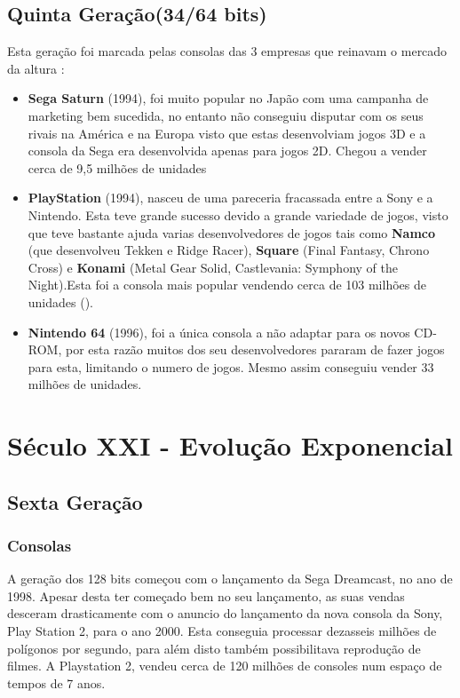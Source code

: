 \documentclass{report}
\begin{document}
\subsection{Quinta Geração(34/64 bits)}
\label{subsec.Quinta Geração}
Esta geração foi marcada pelas consolas das 3 empresas que reinavam o mercado da altura \cite{quintageracao}:
 \begin{itemize}
     \item \textbf{Sega Saturn} (1994), foi muito popular no Japão com uma campanha de marketing bem sucedida, no entanto não conseguiu disputar com os seus rivais na América e na Europa visto que estas desenvolviam jogos 3D e a consola da Sega era desenvolvida apenas para jogos 2D. Chegou a vender cerca de 9,5 milhões de unidades
     \item \textbf{PlayStation} (1994), nasceu de uma pareceria fracassada entre a Sony e a Nintendo. Esta teve grande sucesso devido a grande variedade de jogos, visto que teve bastante ajuda varias desenvolvedores de jogos tais como \textbf{Namco} (que desenvolveu Tekken e Ridge Racer), \textbf{Square} (Final Fantasy, Chrono Cross) e \textbf{Konami} (Metal Gear Solid, Castlevania: Symphony of the Night).Esta foi a consola mais popular vendendo cerca de 103 milhões de unidades (\cite{playstation}).
     \item \textbf{Nintendo 64} (1996), foi a única consola a não adaptar para os novos CD-ROM, por esta razão muitos dos seu desenvolvedores pararam de fazer jogos para esta, limitando o numero de jogos. Mesmo assim conseguiu vender 33 milhões de unidades.
     
     
 \end{itemize}
 
\section{Século XXI - Evolução Exponencial}
\label{sec.Seculo XXI - Evoluçao Exponecial}
\subsection{Sexta Geração}
\label{sub.sexta geraçao}
\subsubsection{Consolas}
\label{subsub.consolas2}
A geração dos 128 bits começou com o lançamento da Sega Dreamcast, no ano de 1998. Apesar desta ter começado bem no seu lançamento, as suas vendas desceram drasticamente com o anuncio do lançamento da nova consola da Sony, Play Station 2, para o ano 2000. Esta conseguia processar dezasseis milhões de polígonos por segundo, para além disto também possibilitava reprodução de filmes. A Playstation 2, vendeu cerca de 120 milhões de consoles num espaço de tempos de 7 anos.
\end{document}
